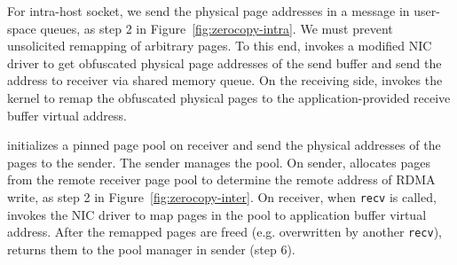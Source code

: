 For intra-host socket, we send the physical page addresses in a message in user-space queues, as step 2 in Figure~\ref{fig:zerocopy-intra}.
We must prevent unsolicited remapping of arbitrary pages.
To this end, \libipc{} invokes a modified NIC driver to 
get obfuscated physical page addresses of the send buffer and send the address to receiver via shared memory queue.
On the receiving side, \libipc{} invokes the kernel to remap the obfuscated physical pages to the application-provided receive buffer virtual address.

\libipc{} initializes a pinned page pool on receiver and send the physical addresses of the pages to the sender.
The sender manages the pool.
On sender, \libipc{} %
allocates pages from the remote receiver page pool to determine the remote address of RDMA write, as step 2 in Figure~\ref{fig:zerocopy-inter}.
On receiver, when \texttt{recv} is called, \libipc invokes the NIC driver to map pages in the pool to application buffer virtual address.
After the remapped pages are freed (e.g. overwritten by another \texttt{recv}), \libipc{} returns them to the pool manager in sender (step 6).

%

